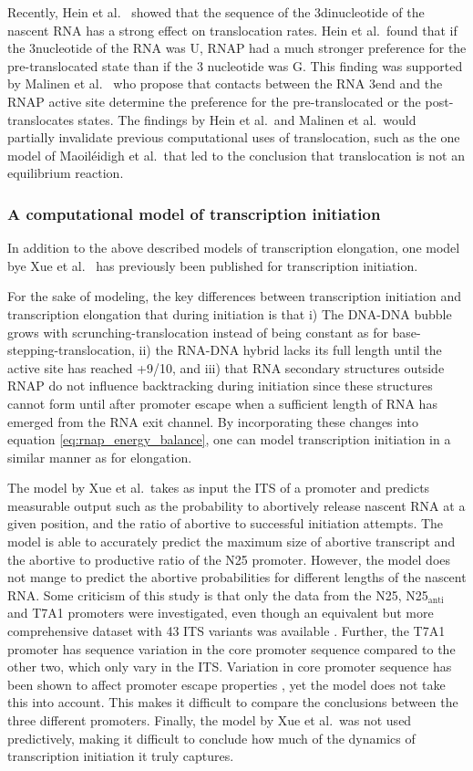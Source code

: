 Recently, Hein et al.\ \cite{hein_rna_2011} showed that the sequence of the
3\ppp dinucleotide of the nascent RNA has a strong effect on translocation
rates.  Hein et al.\ found that if the 3\ppp nucleotide of the RNA was U, RNAP
had a much stronger preference for the pre-translocated state than if the 3\ppp
nucleotide was G. This finding was supported by Malinen et al.\
\cite{malinen_active_2012} who propose that contacts between the RNA 3\ppp end
and the RNAP active site determine the preference for the pre-translocated or
the post-translocates states. The findings by Hein et al.\ and Malinen et al.\
would partially invalidate previous computational uses of translocation, such
as the one model of Maoiléidigh et al.\ that led to the conclusion that
translocation is not an equilibrium reaction.

\subsubsection{A computational model of transcription initiation}
In addition to the above described models of transcription elongation, one
model bye Xue et al.\ \cite{xue_kinetic_2008} has previously been published for
transcription initiation.

For the sake of modeling, the key differences between transcription initiation
and transcription elongation that during initiation is that i) The DNA-DNA
bubble grows with scrunching-translocation instead of being constant as for
base-stepping-translocation, ii) the RNA-DNA hybrid lacks its full length until
the active site has reached +9/10, and iii) that RNA secondary structures
outside RNAP do not influence backtracking during initiation since these
structures cannot form until after promoter escape when a sufficient length of
RNA has emerged from the RNA exit channel. By incorporating these changes into
equation \eqref{eq:rnap_energy_balance}, one can model transcription initiation
in a similar manner as for elongation.

The model by Xue et al.\ takes as input the ITS of a promoter and predicts
measurable output such as the probability to abortively release nascent RNA at
a given position, and the ratio of abortive to successful initiation attempts.
The model is able to accurately predict the maximum size of abortive transcript
and the abortive to productive ratio of the N25 promoter. However, the model
does not mange to predict the abortive probabilities for different lengths of
the nascent RNA. Some criticism of this study is that only the data from the
N25, N25$_{\text{anti}}$ and T7A1 promoters were investigated, even though an
equivalent but more comprehensive dataset with 43 ITS variants was available
\cite{hsu_initial_2006}. Further, the T7A1 promoter has sequence variation in
the core promoter sequence compared to the other two, which only vary in the
ITS.  Variation in core promoter sequence has been shown to affect promoter
escape properties \cite{vo_vitro_2003-1}, yet the model does not take this into
account. This makes it difficult to compare the conclusions between the three
different promoters. Finally, the model by Xue et al.\ was not used
predictively, making it difficult to conclude how much of the dynamics of
transcription initiation it truly captures.

